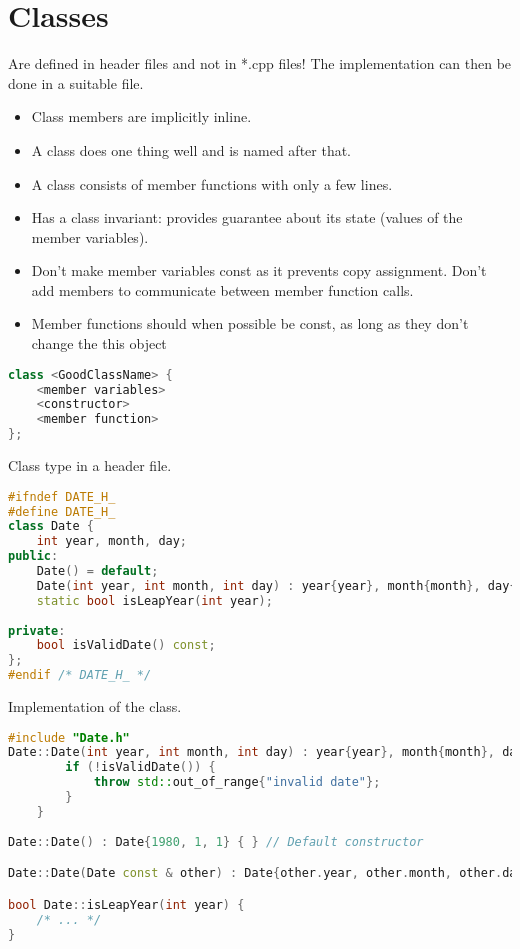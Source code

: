 
\section{Classes}
Are defined in header files and not in *.cpp files! The implementation can then be done in a suitable file.
\begin{itemize}
  \itemsep -0.5em 
  \item Class members are implicitly inline.
  \item A class does one thing well and is named after that.
  \item A class consists of member functions with only a few lines.
  \item Has a class invariant: provides guarantee about its state (values of the member variables).
  \item Don't make member variables const as it prevents copy assignment. Don't add members to communicate between member function calls.
  \item Member functions should when possible be const, as long as they don't change the this object
\end{itemize}

\begin{lstlisting}[language=C++]
class <GoodClassName> {
	<member variables>
	<constructor>
	<member function>
};
\end{lstlisting}

Class type in a header file.
\begin{lstlisting}[language=C++]
#ifndef DATE_H_
#define DATE_H_
class Date {
	int year, month, day;
public:
	Date() = default;
	Date(int year, int month, int day) : year{year}, month{month}, day{day});
	static bool isLeapYear(int year);
	
private:
	bool isValidDate() const;
};
#endif /* DATE_H_ */
\end{lstlisting}

Implementation of the class. 
\begin{lstlisting}[language=C++]
#include "Date.h"
Date::Date(int year, int month, int day) : year{year}, month{month}, day{day} {
		if (!isValidDate()) {
			throw std::out_of_range{"invalid date"}; 
		}
	}
	
Date::Date() : Date{1980, 1, 1} { } // Default constructor

Date::Date(Date const & other) : Date{other.year, other.month, other.day} { } // copy constructor

bool Date::isLeapYear(int year) {
	/* ... */
}
\end{lstlisting}

